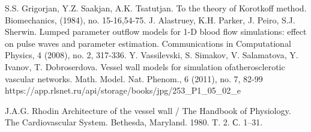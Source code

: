 \begin{thebibliography}{}
     S.S. Grigorjan, Y.Z. Saakjan, A.K. Tsatutjan. To the theory of Korotkoff method. Biomechanics, (1984), no. 15-16,54-75.
    J. Alastruey, K.H. Parker, J. Peiro, S.J. Sherwin. Lumped parameter outflow models for 1-D blood flow simulations: effect on pulse waves and parameter estimation. Communications in Computational Physics, 4 (2008), no. 2, 317-336.
     Y. Vassilevski, S. Simakov, V. Salamatova, Y. Ivanov, T. Dobroserdova. Vessel wall models for simulation ofatherosclerotic vascular networks. Math. Model. Nat. Phenom., 6 (2011), no. 7, 82-99
     https://app.rlsnet.ru/api/storage/books/jpg/253\_P1\_05\_02\_e
    
     J.A.G. Rhodin  Architecture of the vessel wall / The Handbook of Physiology. The Cardiovascular System. Bethesda, Maryland. 1980. T. 2. С. 1–31.
    
\end{thebibliography}
